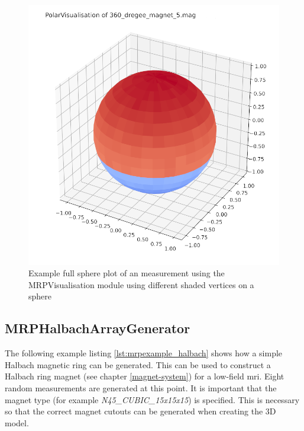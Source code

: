 \begin{figure}
\centering
\includegraphics{./generated_images/border_Example_full_sphere_plot_of_an_measurement_using_the_MRPVisualisation_module_using_different_shaded_vertices_on_a_sphere.png}
\caption{Example full sphere plot of an measurement using the
MRPVisualisation module using different shaded vertices on a sphere
\label{Example_full_sphere_plot_of_an_measurement_using_the_MRPVisualisation_module_using_different_shaded_vertices_on_a_sphere.png}}
\end{figure}

\hypertarget{mrphalbacharraygenerator}{%
\subsection{MRPHalbachArrayGenerator}\label{mrphalbacharraygenerator}}

The following example listing \ref{lst:mrpexample_halbach} shows how a
simple Halbach magnetic ring can be generated. This can be used to
construct a Halbach ring magnet (see chapter \ref{magnet-system}) for a
low-field \gls{mri}. Eight random measurements are generated at this
point. It is important that the magnet type (for example
\emph{N45\_CUBIC\_15x15x15}) is specified. This is necessary so that the
correct magnet cutouts can be generated when creating the 3D model.

